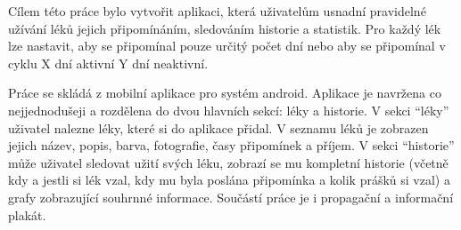\documentclass[../TakeYourPill.tex]{subfiles}
\begin{document}
Cílem této práce bylo vytvořit aplikaci, která uživatelům usnadní pravidelné užívání léků jejich připomínáním, sledováním historie a statistik. Pro každý lék lze nastavit, aby se připomínal pouze určitý počet dní nebo aby se připomínal v cyklu X dní aktivní Y dní neaktivní.

Práce se skládá z mobilní aplikace pro systém android. Aplikace je navržena co nejjednodušeji a rozdělena do dvou hlavních sekcí: léky a historie. V sekci \enquote{léky} uživatel nalezne léky, které si do aplikace přidal. V seznamu léků je zobrazen jejich název, popis, barva, fotografie, časy připomínek a příjem. V sekci \enquote{historie} může uživatel sledovat užití svých léku, zobrazí se mu kompletní historie (včetně kdy a jestli si lék vzal, kdy mu byla poslána připomínka a kolik prášků si vzal) a grafy zobrazující souhrnné informace. Součástí práce je i propagační a informační plakát.
\end{document}
